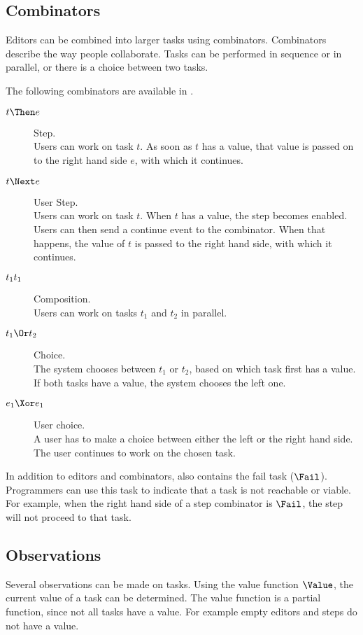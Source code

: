 \subsection{Combinators}

Editors can be combined into larger tasks using combinators.
Combinators describe the way people collaborate.
Tasks can be performed in sequence or in parallel, or there is a choice between two tasks.

The following combinators are available in \TOPHAT.
\begin{description}
  \item[$t \Then e$] Step.\\
    Users can work on task $t$.
    As soon as $t$ has a value, that value is passed on to the right hand side $e$, with which it continues.
  \item[$t \Next e$] User Step.\\
    Users can work on task $t$.
    When $t$ has a value, the step becomes enabled.
    Users can then send a continue event to the combinator.
    When that happens, the value of $t$ is passed to the right hand side, with which it continues.
  \item[$t_1 \relax t_1$] Composition.\\
    Users can work on tasks $t_1$ and $t_2$ in parallel.
  \item[$t_1 \Or t_2$] Choice.\\
    The system chooses between $t_1$ or $t_2$,
    based on which task first has a value.
    If both tasks have a value, the system chooses the left one.
  \item[$e_1 \Xor e_1$] User choice.\\
    A user has to make a choice between either the left or the right hand side.
    The user continues to work on the chosen task.
\end{description}

In addition to editors and combinators, \TOPHAT also contains the fail task ($\Fail$).
Programmers can use this task to indicate that a task is not reachable or viable.
For example, when the right hand side of a step combinator is $\Fail$, the step will not proceed to that task.



\subsection{Observations}

Several observations can be made on tasks.
Using the value function $\Value$, the current value of a task can be determined.
The value function is a partial function, since not all tasks have a value.
For example empty editors and steps do not have a value.

